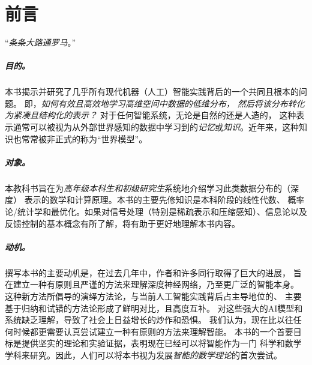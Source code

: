 \documentclass[../../book-main_zh.tex]{subfiles}
\begin{document}
\chapter*{前言}

\begin{center}
    ``{\em 条条大路通罗马}。''

\end{center}
\vspace{5mm}

\paragraph{目的。}
本书揭示并研究了几乎所有现代机器（人工）智能实践背后的一个共同且根本的问题。
即，{\em 如何有效且高效地学习高维空间中数据的低维分布，
    然后将该分布转化为紧凑且结构化的表示？} 对于任何智能系统，无论是自然的还是人造的，
这种表示通常可以被视为从外部世界感知的数据中学习到的{\em 记忆}或{\em 知识}。近年来，这种知识也常常被非正式的称为“世界模型”。

\paragraph{对象。}
本教科书旨在为{\em 高年级本科生和初级研究生}系统地介绍学习此类数据分布的（深度）
表示的数学和计算原理。本书的主要先修知识是本科阶段的线性代数、
概率论/统计学和最优化。如果对信号处理（特别是稀疏表示和压缩感知）、信息论以及
反馈控制的基本概念有所了解，将有助于更好地理解本书内容。

\paragraph{动机。}
撰写本书的主要动机是，在过去几年中，作者和许多同行取得了巨大的进展，
旨在建立一种有原则且严谨的方法来理解深度神经网络，乃至更广泛的智能本身。
这种新方法所倡导的演绎方法论，与当前人工智能实践背后占主导地位的、
主要基于归纳和试错的方法论形成了鲜明对比，且高度互补。
对这些强大的AI模型和系统缺乏理解，导致了社会上日益增长的炒作和恐惧。
我们认为，现在比以往任何时候都更需要认真尝试建立一种有原则的方法来理解智能。
本书的一个首要目标是提供坚实的理论和实验证据，表明现在已经可以将智能作为一门
科学和数学学科来研究。因此，人们可以将本书视为发展{\em 智能的数学理论}的首次尝试。
\end{document}

